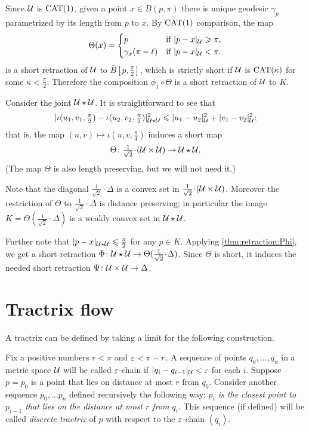 \documentclass[oneside,a4paper, 12pt]{article}
\begin{document}
Since ${\mathcal{U}}$ is $\mathrm{CAT}(1)$,
given a point $x\in B(p,\pi)$ there is unique geodesic $\gamma_p$ parametrized by its length from $p$ to $x$. 
By $\mathrm{CAT}(1)$ comparison, the map 
\[\Theta(x)=
\begin{cases}
p&\text{if\ }|p-x|_{\mathcal{U}}\geqslant \pi,
\\
\gamma_x(\pi-\ell)&\text{if\ }|p-x|_{\mathcal{U}}< \pi.
\end{cases}
\]
is a short retraction of ${\mathcal{U}}$ to $\bar B[p,\tfrac\pi2]$, which is strictly short if $\mathcal{U}$ is $\mathrm{CAT}(\kappa)$ for some $\kappa<\tfrac\pi2$.
Therefore the composition $\phi_1\circ\Theta$ is a short retraction of ${\mathcal{U}}$ to $K$.
\qeds


Consider the joint $\mathcal{U}\star\mathcal{U}$.
It is straightforward to see that 
\[|\iota(u_1,v_1,\tfrac\pi2)-\iota(u_2,v_2,\tfrac\pi2)|^2_{\mathcal{U}\star\mathcal{U}}\leqslant |u_1-u_2|^2_{\mathcal{U}}+|v_1-v_2|_{\mathcal{U}}^2;\]
that is, the map $(u,v)\mapsto \iota(u,v,\tfrac\pi4)$ induces a short map 
\[\Theta\:{\tfrac1{\sqrt{2}}}\cdot(\spc{U}\times\spc{U})\to\spc{U}\star\spc{U}.\]
(The map $\Theta$ is also length preserving, but we will not need it.)

Note that the diagonal $\tfrac1{\sqrt{2}}\cdot\Delta$ is a convex set in $\tfrac1{\sqrt{2}}\cdot(\spc{U}\times\spc{U})$.
Moreover the restriction of $\Theta$ to $\tfrac1{\sqrt{2}}\cdot\Delta$ is distance preserving;
in particular the image $K=\Theta(\tfrac1{\sqrt{2}}\cdot\Delta)$ is a weakly convex set in $\mathcal{U}\star\mathcal{U}$.

Further note that $|p-x|_{\mathcal{U}\star\mathcal{U}}\leqslant \tfrac\pi2$ for any $p\in K$.
Applying \ref{thm:retraction:Phi}, we get a short retraction $\Phi\:\spc{U}\star\spc{U}\to \Theta(\tfrac1{\sqrt{2}}\cdot\Delta)$.
Since $\Theta$ is short, it induces the needed short retraction $\Psi\colon\mathcal{U}\times\mathcal{U}\to \Delta$.
\qeds

\appendix

\section{Tractrix flow}\label{sec:Tractrix flow}

A tractrix can be defined by taking a limit for the following construction.

Fix a positive numbers $r<\pi$ and $\varepsilon<\pi-r$. 
A sequence of points $q_0,\dots,q_n$ in a metric space ${\mathcal{U}}$ will be called $\varepsilon$-chain if $|q_i-q_{i-1}|_{\mathcal{U}}<\varepsilon$ for each $i$.
Suppose $p=p_0$ is a point that lies on distance at most $r$ from  $q_0$.
Consider another sequence $p_0,\dots p_n$ defined recursively the following way:
\emph{$p_i$ is the closest point to $p_{i-1}$ that lies on the distance at most $r$ from $q_i$}.
This sequence (if defined) will be called \emph{discrete tractrix} of $p$ with respect to the $\varepsilon$-chain $(q_i)$.
\end{document}
